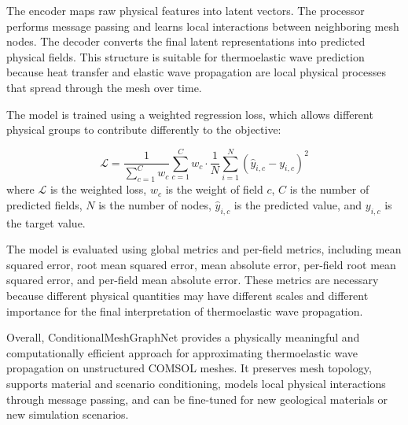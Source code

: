The encoder maps raw physical features into latent vectors. The processor performs message passing and learns local interactions between neighboring mesh nodes. The decoder converts the final latent representations into predicted physical fields. This structure is suitable for thermoelastic wave prediction because heat transfer and elastic wave propagation are local physical processes that spread through the mesh over time.

The model is trained using a weighted regression loss, which allows different physical groups to contribute differently to the objective:

\begin{equation}
\mathcal{L}
=
\frac{1}{\sum_{c=1}^{C} w_c}
\sum_{c=1}^{C}
w_c
\cdot
\frac{1}{N}
\sum_{i=1}^{N}
\left(
\hat{y}_{i,c}
-
y_{i,c}
\right)^2
\end{equation}
where \(\mathcal{L}\) is the weighted loss, \(w_c\) is the weight of field \(c\), \(C\) is the number of predicted fields, \(N\) is the number of nodes, \(\hat{y}_{i,c}\) is the predicted value, and \(y_{i,c}\) is the target value.

The model is evaluated using global metrics and per-field metrics, including mean squared error, root mean squared error, mean absolute error, per-field root mean squared error, and per-field mean absolute error. These metrics are necessary because different physical quantities may have different scales and different importance for the final interpretation of thermoelastic wave propagation.

Overall, ConditionalMeshGraphNet provides a physically meaningful and computationally efficient approach for approximating thermoelastic wave propagation on unstructured COMSOL meshes. It preserves mesh topology, supports material and scenario conditioning, models local physical interactions through message passing, and can be fine-tuned for new geological materials or new simulation scenarios.